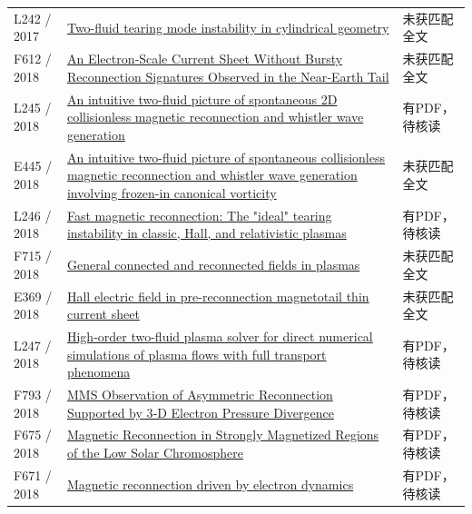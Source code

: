 \begin{longtable}{P{24mm}P{97mm}P{27mm}}
L242 / 2017 & \href{https://doi.org/10.1063/1.4986116}{Two-fluid tearing mode instability in cylindrical geometry} & 未获匹配全文\\

F612 / 2018 & \href{https://doi.org/10.1002/2017gl076330}{An Electron‐Scale Current Sheet Without Bursty Reconnection Signatures Observed in the Near‐Earth Tail} & 未获匹配全文\\

L245 / 2018 & \href{https://doi.org/10.1063/1.5016345}{An intuitive two-fluid picture of spontaneous 2D collisionless magnetic reconnection and whistler wave generation} & 有PDF，待核读\\

E445 / 2018 & \href{https://ui.adsabs.harvard.edu/abs/2018cosp...42E3772Y/abstract}{An intuitive two-fluid picture of spontaneous collisionless magnetic reconnection and whistler wave generation involving frozen-in canonical vorticity} & 未获匹配全文\\

L246 / 2018 & \href{https://doi.org/10.1088/1742-6596/1031/1/012020}{Fast magnetic reconnection: The "ideal" tearing instability in classic,  Hall,  and relativistic plasmas} & 有PDF，待核读\\

F715 / 2018 & \href{https://doi.org/10.1063/1.5021492}{General connected and reconnected fields in plasmas} & 未获匹配全文\\

E369 / 2018 & \href{https://ui.adsabs.harvard.edu/abs/2018AGUFMSM13B2865L/abstract}{Hall electric field in pre-reconnection magnetotail thin current sheet} & 未获匹配全文\\

L247 / 2018 & \href{https://doi.org/10.1063/1.5082190}{High-order two-fluid plasma solver for direct numerical simulations of plasma flows with full transport phenomena} & 有PDF，待核读\\

F793 / 2018 & \href{https://doi.org/10.1002/2017ja025019}{MMS Observation of Asymmetric Reconnection Supported by 3‐D Electron Pressure Divergence} & 有PDF，待核读\\

F675 / 2018 & \href{https://doi.org/10.3847/1538-4357/aa9edb}{Magnetic Reconnection in Strongly Magnetized Regions of the Low Solar Chromosphere} & 有PDF，待核读\\

F671 / 2018 & \href{https://doi.org/10.1038/s41467-018-07415-3}{Magnetic reconnection driven by electron dynamics} & 有PDF，待核读\\


\end{longtable}
